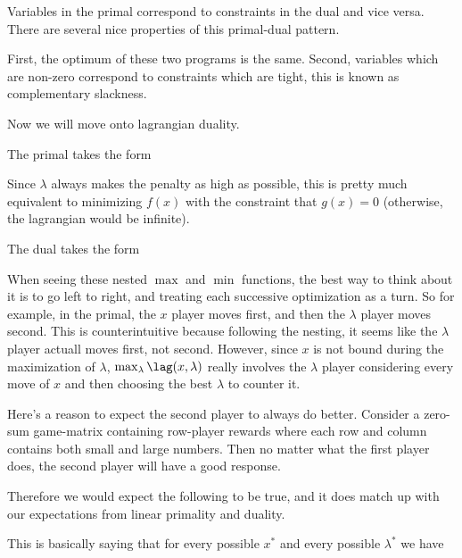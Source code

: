 \documentclass[12pt]{article}
\begin{document}

Variables in the primal correspond to constraints in the dual and vice versa. There are several nice properties of this primal-dual pattern.

First, the optimum of these two programs is the same. Second, variables which are non-zero correspond to constraints which are tight, this is known as complementary slackness. 

Now we will move onto lagrangian duality.

The primal takes the form


Since $\lambda$ always makes the penalty as high as possible, this is pretty much equivalent to minimizing $f(x)$ with the constraint that $g(x) = 0$ (otherwise, the lagrangian would be infinite).

The dual takes the form


When seeing these nested $\max$ and $\min$ functions, the best way to think about it is to go left to right, and treating each successive optimization as a turn. So for example, in the primal, the $x$ player moves first, and then the $\lambda$ player moves second. This is counterintuitive because following the nesting, it seems like the $\lambda$ player actuall moves first, not second. However, since $x$ is not bound during the maximization of $\lambda$, $\max_\lambda \lag(x, \lambda)$ really involves the $\lambda$ player considering every move of $x$ and then choosing the best $\lambda$ to counter it.

Here's a reason to expect the second player to always do better. Consider a zero-sum game-matrix containing row-player rewards  where each row and column contains both small and large numbers. Then no matter what the first player does, the second player will have a good response.

Therefore we would expect the following to be true, and it does match up with our expectations from linear primality and duality.


This is basically saying that for every possible $x^*$ and every possible $\lambda^*$ we have
\end{document}
